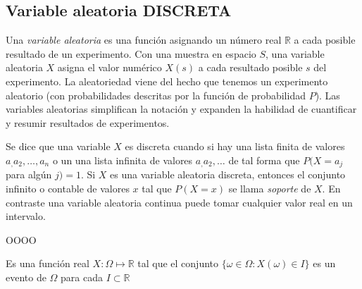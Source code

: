 \subsection {Variable aleatoria DISCRETA}
Una \emph{variable aleatoria} es una función asignando un número real $\mathbb{R}$ a cada posible resultado de un experimento. Con una muestra en espacio $S$, una variable aleatoria $X$ asigna el valor numérico $X(s)$ a cada resultado posible $s$ del experimento. La aleatoriedad viene del hecho que tenemos un experimento aleatorio (con probabilidades descritas por la función de probabilidad $P$). Las variables aleatorias simplifican la notación y expanden la habilidad de cuantificar y resumir resultados de experimentos.

Se dice que una variable $X$ es discreta cuando si hay una lista finita de valores $a_,a_2,\ldots,a_n$ o un una lista infinita de valores $a_,a_2,\ldots$ de tal forma que $P(X=a_j$ para algún $j)=1$. Si $X$ es una variable aleatoria discreta, entonces el conjunto infinito o contable de valores $x$ tal que $P(X=x)$ se llama \emph{soporte} de $X$. En contraste una variable aleatoria continua puede tomar cualquier valor real en un intervalo.

OOOO

Es una función real $X: \Omega\mapsto\mathbb{R}$ tal que el conjunto $\{\omega\in\Omega:X(\omega)\in I\}$ es un evento de $\Omega$ para cada $I\subset\mathbb{R}$
